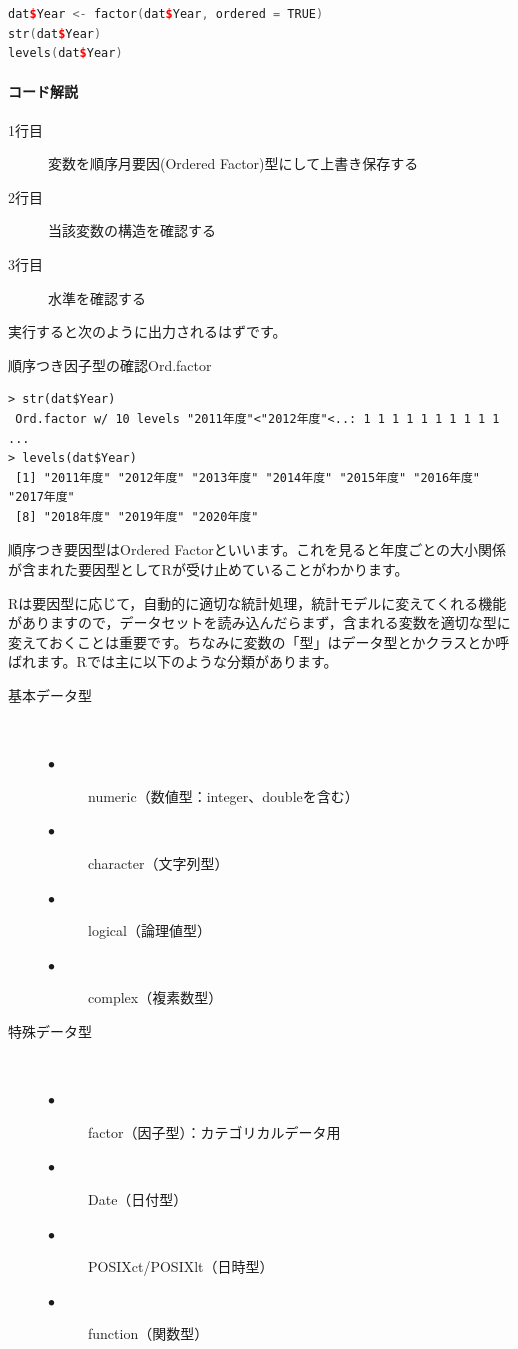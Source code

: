 \documentclass{ltjsbook}
\begin{document}
\begin{lstlisting}[language=c++,label={code:4_03},caption={Ord.Factor型に変換する}]
dat$Year <- factor(dat$Year, ordered = TRUE)
str(dat$Year)
levels(dat$Year)
\end{lstlisting}
    
\paragraph{コード解説}
\begin{description}
    \item[1行目] 変数を順序月要因(Ordered Factor)型にして上書き保存する
    \item[2行目] 当該変数の構造を確認する
    \item[3行目] 水準を確認する 
\end{description}

実行すると次のように出力されるはずです。
\begin{Rscreen}{順序つき因子型の確認}{Ord.factor}
\begin{verbatim}
> str(dat$Year)
 Ord.factor w/ 10 levels "2011年度"<"2012年度"<..: 1 1 1 1 1 1 1 1 1 1 ...
> levels(dat$Year)
 [1] "2011年度" "2012年度" "2013年度" "2014年度" "2015年度" "2016年度" "2017年度" 
 [8] "2018年度" "2019年度" "2020年度"
\end{verbatim}
\end{Rscreen}

順序つき要因型はOrdered Factorといいます。これを見ると年度ごとの大小関係が含まれた要因型としてRが受け止めていることがわかります。

Rは要因型に応じて，自動的に適切な統計処理，統計モデルに変えてくれる機能がありますので，データセットを読み込んだらまず，含まれる変数を適切な型に変えておくことは重要です。ちなみに変数の「型」はデータ型とかクラスとか呼ばれます。Rでは主に以下のような分類があります。

\begin{description}
    \item[基本データ型]~
    \begin{description}
        \item[$\bullet$] numeric（数値型：integer、doubleを含む）
        \item[$\bullet$] character（文字列型）
        \item[$\bullet$] logical（論理値型）
        \item[$\bullet$] complex（複素数型）
    \end{description}
    
    \item[特殊データ型]~
    \begin{description}
        \item[$\bullet$] factor（因子型）：カテゴリカルデータ用
        \item[$\bullet$] Date（日付型）
        \item[$\bullet$] POSIXct/POSIXlt（日時型）
        \item[$\bullet$] function（関数型）
    \end{description}
\end{description}
\end{document}
